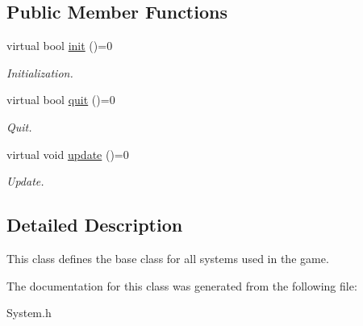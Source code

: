 \subsection*{Public Member Functions}
\begin{DoxyCompactItemize}
\item 
\mbox{\label{class_system_acf69544628d6c807ebd7dc03118711f0}} 
virtual bool \mbox{\hyperlink{class_system_acf69544628d6c807ebd7dc03118711f0}{init}} ()=0
\begin{DoxyCompactList}\small\item\em Initialization. \end{DoxyCompactList}\item 
\mbox{\label{class_system_a85561f23cf200852888f337af183f9b7}} 
virtual bool \mbox{\hyperlink{class_system_a85561f23cf200852888f337af183f9b7}{quit}} ()=0
\begin{DoxyCompactList}\small\item\em Quit. \end{DoxyCompactList}\item 
\mbox{\label{class_system_aad9113b7c2864e72d96232eadc13bc39}} 
virtual void \mbox{\hyperlink{class_system_aad9113b7c2864e72d96232eadc13bc39}{update}} ()=0
\begin{DoxyCompactList}\small\item\em Update. \end{DoxyCompactList}\end{DoxyCompactItemize}


\subsection{Detailed Description}
This class defines the base class for all systems used in the game. 

The documentation for this class was generated from the following file\+:\begin{DoxyCompactItemize}
\item 
System.\+h\end{DoxyCompactItemize}
